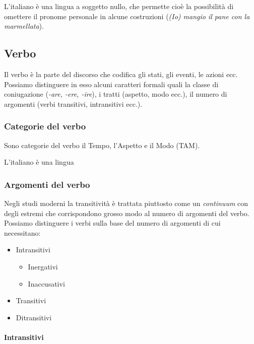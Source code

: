 \documentclass[a4paper,twoside,11pt,chapterprefix=false,bibliography=totocnumbered,listof=flat]{scrbook}
\providecommand{\tightlist}{%
  \setlength{\itemsep}{0pt}\setlength{\parskip}{0pt}}
\let\oldparagraph\paragraph
\renewcommand{\paragraph}[1]{\oldparagraph{#1}\mbox{}}
\begin{document}
L'italiano è una lingua a soggetto nullo, che permette cioè la
possibilità di omettere il pronome personale in alcune costruzioni
(\emph{(Io) mangio il pane con la marmellata}).

\hypertarget{verbo}{%
\subsection{Verbo}\label{verbo}}

Il verbo è la parte del discorso che codifica gli stati, gli eventi, le
azioni ecc. Possiamo distinguere in esso alcuni caratteri formali quali
la classe di coniugazione (\emph{-are, -ere, -ire}), i tratti (aspetto,
modo ecc.), il numero di argomenti (verbi transitivi, intransitivi
ecc.).

\hypertarget{categorie-del-verbo}{%
\subsubsection{Categorie del verbo}\label{categorie-del-verbo}}

Sono categorie del verbo il Tempo, l'Aspetto e il Modo (TAM).

L'italiano è una lingua

\hypertarget{argomenti-del-verbo}{%
\subsubsection{Argomenti del verbo}\label{argomenti-del-verbo}}

Negli studi moderni la transitività è trattata piuttosto come un
\emph{continuum} con degli estremi che corrispondono grosso modo al
numero di argomenti del verbo. Possiamo distinguere i verbi sulla base
del numero di argomenti di cui necessitano:

\begin{itemize}
\tightlist
\item
  Intransitivi

  \begin{itemize}
  \tightlist
  \item
    Inergativi
  \item
    Inaccusativi
  \end{itemize}
\item
  Transitivi
\item
  Ditransitivi
\end{itemize}

\hypertarget{intransitivi}{%
\paragraph{Intransitivi}\label{intransitivi}}
\end{document}
